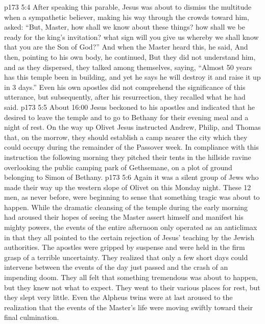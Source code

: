 \vs p173 5:4 \pc After speaking this parable, Jesus was about to dismiss the multitude when a sympathetic believer, making his way through the crowds toward him, asked: “But, Master, how shall we know about these things? how shall we be ready for the king’s invitation? what sign will you give us whereby we shall know that you are the Son of God?” And when the Master heard this, he said,  And then, pointing to his own body, he continued,  But they did not understand him, and as they dispersed, they talked among themselves, saying, “Almost 50 years has this temple been in building, and yet he says he will destroy it and raise it up in 3 days.” Even his own apostles did not comprehend the significance of this utterance, but subsequently, after his resurrection, they recalled what he had said.
\vs p173 5:5 About 16:00 Jesus beckoned to his apostles and indicated that he desired to leave the temple and to go to Bethany for their evening meal and a night of rest. On the way up Olivet Jesus instructed Andrew, Philip, and Thomas that, on the morrow, they should establish a camp nearer the city which they could occupy during the remainder of the Passover week. In compliance with this instruction the following morning they pitched their tents in the hillside ravine overlooking the public camping park of Gethsemane, on a plot of ground belonging to Simon of Bethany.
\vs p173 5:6 Again it was a silent group of Jews who made their way up the western slope of Olivet on this Monday night. These 12 men, as never before, were beginning to sense that something tragic was about to happen. While the dramatic cleansing of the temple during the early morning had aroused their hopes of seeing the Master assert himself and manifest his mighty powers, the events of the entire afternoon only operated as an anticlimax in that they all pointed to the certain rejection of Jesus’ teaching by the Jewish authorities. The apostles were gripped by suspense and were held in the firm grasp of a terrible uncertainty. They realized that only a few short days could intervene between the events of the day just passed and the crash of an impending doom. They all felt that something tremendous was about to happen, but they knew not what to expect. They went to their various places for rest, but they slept very little. Even the Alpheus twins were at last aroused to the realization that the events of the Master’s life were moving swiftly toward their final culmination.
\quizlink
